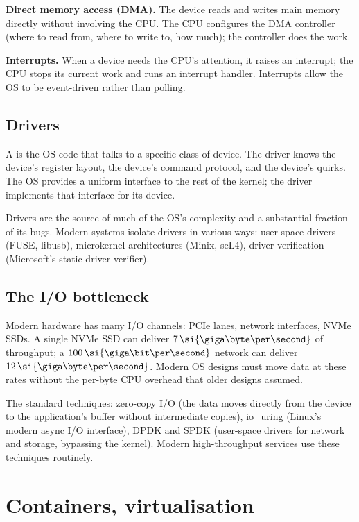 \textbf{Direct memory access (DMA).} The device reads and writes main memory directly without involving the CPU. The CPU configures the DMA controller (where to read from, where to write to, how much); the controller does the work.

\textbf{Interrupts.} When a device needs the CPU's attention, it raises an interrupt; the CPU stops its current work and runs an interrupt handler. Interrupts allow the OS to be event-driven rather than polling.

\subsection{Drivers}

A  is the OS code that talks to a specific class of device. The driver knows the device's register layout, the device's command protocol, and the device's quirks. The OS provides a uniform interface to the rest of the kernel; the driver implements that interface for its device.

Drivers are the source of much of the OS's complexity and a substantial fraction of its bugs. Modern systems isolate drivers in various ways: user-space drivers (FUSE, libusb), microkernel architectures (Minix, seL4), driver verification (Microsoft's static driver verifier).

\subsection{The I/O bottleneck}

Modern hardware has many I/O channels: PCIe lanes, network interfaces, NVMe SSDs. A single NVMe SSD can deliver $7\,\si{\giga\byte\per\second}$ of throughput; a $100\,\si{\giga\bit\per\second}$ network can deliver $12\,\si{\giga\byte\per\second}$. Modern OS designs must move data at these rates without the per-byte CPU overhead that older designs assumed.

The standard techniques: zero-copy I/O (the data moves directly from the device to the application's buffer without intermediate copies), io\_uring (Linux's modern async I/O interface), DPDK and SPDK (user-space drivers for network and storage, bypassing the kernel). Modern high-throughput services use these techniques routinely.

\section{Containers, virtualisation}

